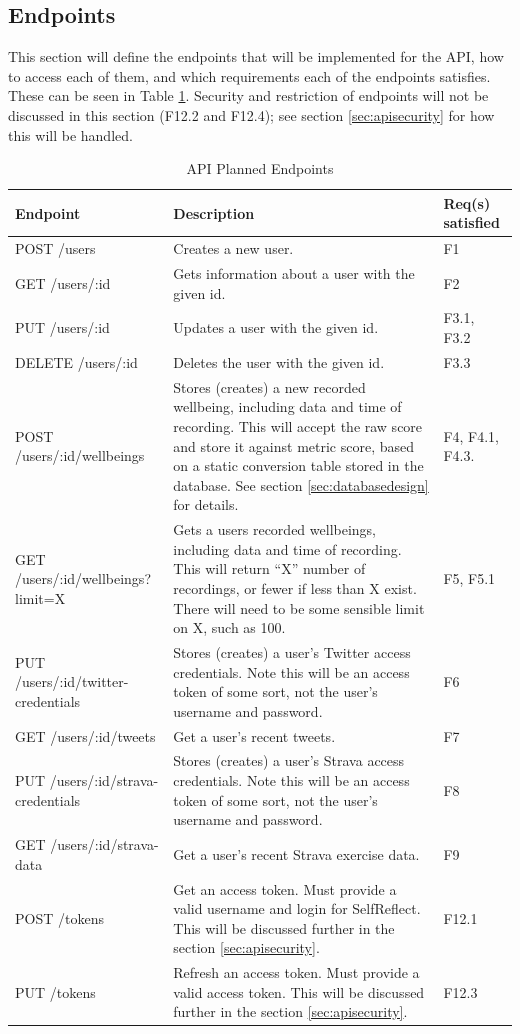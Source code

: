 \documentclass[11pt,openright,a4paper]{report}
\begin{document}
\newpage
\subsection{Endpoints} \label{sec:apiendpoints}
This section will define the endpoints that will be implemented for the API,  how to access each of them, and which requirements each of the endpoints satisfies. These can be seen in Table \ref{tab:designendpoints}. Security and restriction of endpoints will not be discussed in this section (F12.2 and F12.4); see section \ref{sec:apisecurity} for how this will be handled.

\begin{longtable}{| p{6cm} | p{6cm} | p{2cm} |}
\caption{API Planned Endpoints}
\label{tab:designendpoints} \\
\hline
\textbf{Endpoint} & \textbf{Description} & \textbf{Req(s) satisfied} \\ \hline
POST /users & Creates a new user. & F1 \\ \hline
GET /users/:id & Gets information about a user with the given id. & F2 \\ \hline
PUT /users/:id & Updates a user with the given id. & F3.1, F3.2 \\ \hline
DELETE /users/:id & Deletes the user with the given id. & F3.3 \\ \hline
POST /users/:id/wellbeings & Stores (creates) a new recorded wellbeing, including data and time of recording. This will accept the raw score and store it against metric score, based on a static conversion table stored in the database. See section \ref{sec:databasedesign} for details. & F4, F4.1, F4.3. \\ \hline
GET /users/:id/wellbeings?limit=X & Gets a users recorded wellbeings, including data and time of recording. This will return \enquote{X} number of recordings, or fewer if less than X exist. There will need to be some sensible limit on X, such as 100. & F5, F5.1\\ \hline
PUT /users/:id/twitter-credentials & Stores (creates) a user's Twitter access credentials. Note this will be an access token of some sort, not the user's username and password. & F6 \\ \hline
GET /users/:id/tweets & Get a user's recent tweets. & F7 \\ \hline
PUT /users/:id/strava-credentials  & Stores (creates) a user's Strava access credentials. Note this will be an access token of some sort, not the user's username and password.& F8 \\ \hline
GET /users/:id/strava-data  & Get a user's recent Strava exercise data. & F9 \\ \hline
POST /tokens & Get an access token. Must provide a valid username and login for SelfReflect. This will be discussed further in the section \ref{sec:apisecurity}. & F12.1 \\ \hline
PUT /tokens & Refresh an access token. Must provide a valid access token. This will be discussed further in the section \ref{sec:apisecurity}. & F12.3 \\ \hline
\end{longtable}
\end{document}
